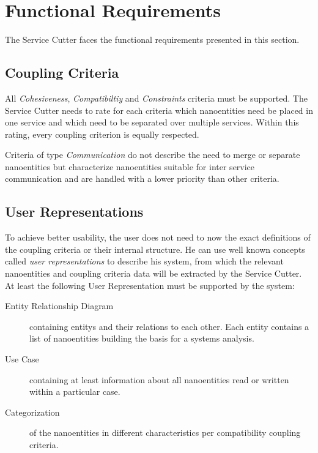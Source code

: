 \section{Functional Requirements}

The Service Cutter faces the functional requirements presented in this
section.


\subsection{Coupling Criteria}

All \textit{Cohesiveness}, \textit{Compatibiltiy} and \textit{Constraints} criteria must be supported. The Service Cutter needs to rate for each criteria which nanoentities need be placed in one service and which need to be separated over multiple services. Within this rating, every coupling criterion is equally respected.

Criteria of type \textit{Communication} do not describe the need to merge or separate nanoentities but characterize nanoentities suitable for inter service communication and are handled with a lower priority than other criteria. 

\subsection{User Representations}

To achieve better usability, the user does not need to now the exact definitions of the coupling criteria or their internal structure. He can use well known concepts called \textit{user representations} to describe his system, from which the relevant nanoentities and coupling criteria data will be extracted by the Service Cutter. At least the following User Representation must be supported by the system:

\begin{description}
	\item[Entity Relationship Diagram] containing \glspl{entity} and their relations to each other. Each entity contains a list of nanoentities building the basis for a systems analysis.
	\item[Use Case] containing at least information about all nanoentities read or written within a particular case. 
	\item[Categorization] of the nanoentities in different characteristics per compatibility coupling criteria. 
\end{description}

